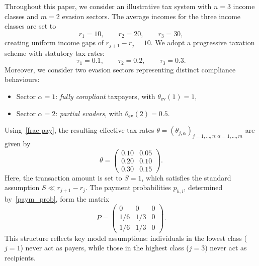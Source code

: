 \documentclass[11pt]{article}
\theoremstyle{plain}
\theoremstyle{definition}
\newcommand{\1}{\mathbf{1}}
\begin{document}
Throughout this paper, we consider an illustrative tax system with $n=3$ income classes and $m=2$ evasion sectors.
The average incomes for the three income classes are set to
\begin{equation*}
r_1 = 10, \qquad r_2 = 20, \qquad r_3 = 30,    
\end{equation*}
\noindent creating uniform income gaps of $r_{j+1} - r_j = 10$. We adopt a progressive taxation scheme with statutory tax rates:
\begin{equation*}
   \tau_1 = 0.1, \qquad \tau_2 = 0.2, \qquad \tau_3 = 0.3. 
\end{equation*}
Moreover, we consider two evasion sectors representing distinct compliance behaviours:
\begin{itemize}
    \item Sector $\alpha=1$: \emph{fully compliant} taxpayers, with $\theta_{\mathrm{ev}}(1) = 1$,
    \item Sector $\alpha=2$: \emph{partial evaders}, with $\theta_{\mathrm{ev}}(2) = 0.5$.
\end{itemize}
Using~\eqref{frac-pay}, the resulting effective tax rates $\theta=(\theta_{j,\alpha})_{j=1,\ldots,n;\alpha=1,\ldots,m}$ are given by
\begin{equation*}
    \theta = 
\begin{pmatrix}
0.10 & 0.05\\
0.20 & 0.10\\
0.30 & 0.15
\end{pmatrix}.
\end{equation*}
Here, the transaction amount is set to $S = 1$, which satisfies the standard assumption ${S \ll r_{j+1} - r_j}$. The payment probabilities $p_{h,l}$, determined by~\eqref{paym_prob}, form the matrix
\begin{equation*}
 P =
\begin{pmatrix}
0 & 0 & 0\\[0.2ex]
{1}/{6} & {1}/{3} & 0\\[0.2ex]
{1}/{6} & {1}/{3} & 0
\end{pmatrix}.   
\end{equation*}
\noindent This structure reflects key model assumptions: individuals in the lowest class ($j=1$) never act as payers, while those in the highest class ($j=3$) never act as recipients.
\end{document}
